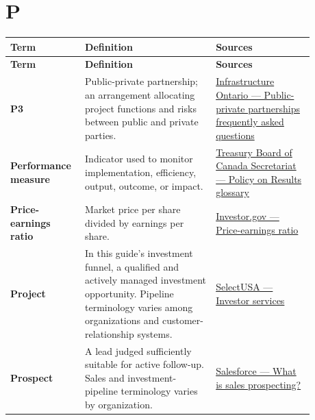 \documentclass[11pt,letterpaper,oneside,openany]{book}
\begin{document}
\section[P]{P}
\begin{center}
\small
\setlength{\LTpre}{0.4em}
\setlength{\LTpost}{0.8em}
\begin{longtable}{>{\RaggedRight\arraybackslash}p{0.180\linewidth}>{\RaggedRight\arraybackslash}p{0.400\linewidth}>{\RaggedRight\arraybackslash}p{0.300\linewidth}}
\rowcolor{DeepNavy}
\color{white}\bfseries Term & \color{white}\bfseries Definition & \color{white}\bfseries Sources \\
\endfirsthead
\rowcolor{DeepNavy}
\color{white}\bfseries Term & \color{white}\bfseries Definition & \color{white}\bfseries Sources \\
\endhead
\textbf{P3} & Public-private partnership; an arrangement allocating project functions and risks between public and private parties. & \href{https://www.infrastructureontario.ca/en/what-we-do/capital-delivery/faqs---public-private-partnerships-p3s/}{Infrastructure Ontario --- Public-private partnerships frequently asked questions} \\
\textbf{Performance measure} & Indicator used to monitor implementation, efficiency, output, outcome, or impact. & \href{https://www.tbs-sct.canada.ca/pol/doc-eng.aspx?id=31300\&section=glossary}{Treasury Board of Canada Secretariat --- Policy on Results glossary} \\
\textbf{Price-earnings ratio} & Market price per share divided by earnings per share. & \href{https://www.investor.gov/introduction-investing/investing-basics/glossary/price-earnings-pe-ratio}{Investor.gov --- Price-earnings ratio} \\
\textbf{Project} & In this guide's investment funnel, a qualified and actively managed investment opportunity. Pipeline terminology varies among organizations and customer-relationship systems. & \href{https://www.trade.gov/selectusa-investor}{SelectUSA --- Investor services} \\
\textbf{Prospect} & A lead judged sufficiently suitable for active follow-up. Sales and investment-pipeline terminology varies by organization. & \href{https://www.salesforce.com/sales/prospecting/}{Salesforce --- What is sales prospecting?} \\
\end{longtable}
\end{center}
\end{document}
